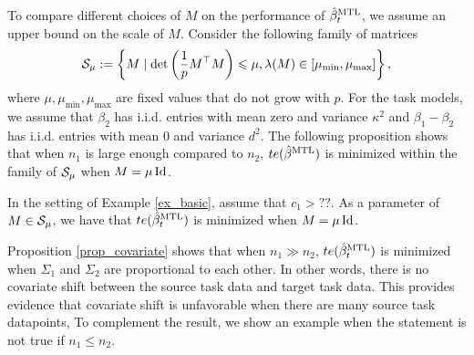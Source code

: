 \begin{example}\label{ex_cov_family}
	To compare different choices of $M$ on the performance of $\hat{\beta}_t^{\text{MTL}}$, we assume an upper bound on the scale of $M$.
	Consider the following family of matrices
	\begin{align*}
		\mathcal{S}_{\mu}:=\left\{ M \mid \det\left({\frac{1}{p}M^\top M}\right) \leqslant \mu, \lambda(M) \in [\mu_{\min}, \mu_{\max}] \right\},
	\end{align*}
	where $\mu, \mu_{\min}, \mu_{\max}$ are fixed values that do not grow with $p$.
	For the task models, we assume that $\beta_2$ has i.i.d. entries with mean zero and variance $\kappa^2$ and $\beta_1 - \beta_2$ has i.i.d. entries with mean $0$ and variance $d^2$.
	The following proposition shows that when $n_1$ is large enough compared to $n_2$, $te(\hat{\beta}^{\text{MTL}})$ is minimized within the family of $\mathcal{S}_{\mu}$ when $M = \mu\operatorname{Id}$.
\end{example}

\begin{proposition}\label{prop_covariate}
	In the setting of Example \ref{ex_basic}, assume that $c_1 > ??$.
	As a parameter of $M \in \mathcal{S}_{\mu}$, we have that $te(\hat{\beta}_t^{\text{MTL}})$ is minimized when $M = \mu\operatorname{Id}$.
\end{proposition}

Proposition \ref{prop_covariate} shows that when $n_1\gg n_2$, $te(\hat{\beta}_t^{\text{MTL}})$ is minimized when $\Sigma_1$ and $\Sigma_2$ are proportional to each other.
In other words, there is no covariate shift between the source task data and target task data.
This provides evidence that covariate shift is unfavorable when there are many source task datapoints,
To complement the result, we show an example when the statement is not true if $n_1 \le n_2$.

